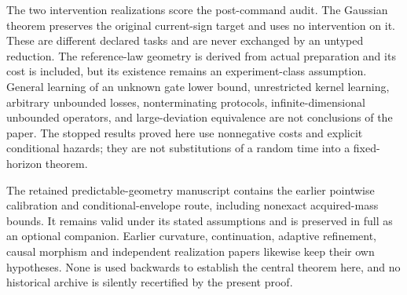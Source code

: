 The two intervention realizations score the post-command audit. The Gaussian theorem preserves the original current-sign target and uses no intervention on it. These are different declared tasks and are never exchanged by an untyped reduction. The reference-law geometry is derived from actual preparation and its cost is included, but its existence remains an experiment-class assumption. General learning of an unknown gate lower bound, unrestricted kernel learning, arbitrary unbounded losses, nonterminating protocols, infinite-dimensional unbounded operators, and large-deviation equivalence are not conclusions of the paper. The stopped results proved here use nonnegative costs and explicit conditional hazards; they are not substitutions of a random time into a fixed-horizon theorem.

The retained predictable-geometry manuscript contains the earlier pointwise calibration and conditional-envelope route, including nonexact acquired-mass bounds. It remains valid under its stated assumptions and is preserved in full as an optional companion. Earlier curvature, continuation, adaptive refinement, causal morphism and independent realization papers likewise keep their own hypotheses. None is used backwards to establish the central theorem here, and no historical archive is silently recertified by the present proof.
